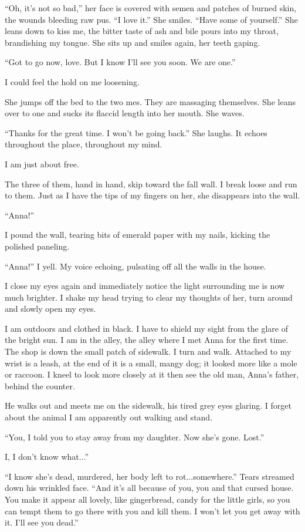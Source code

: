 \documentclass[
]{article}
\begin{document}
``Oh, it's not so bad,'' her face is covered with semen and patches of
burned skin, the wounds bleeding raw pus. ``I love it.'' She smiles.
``Have some of yourself.'' She leans down to kiss me, the bitter taste
of ash and bile pours into my throat, brandishing my tongue. She sits up
and smiles again, her teeth gaping.

``Got to go now, love. But I know I'll see you soon. We are one.''

I could feel the hold on me loosening.

She jumps off the bed to the two mes. They are massaging themselves. She
leans over to one and sucks its flaccid length into her mouth. She
waves.

``Thanks for the great time. I won't be going back.'' She laughs. It
echoes throughout the place, throughout my mind.

I am just about free.

The three of them, hand in hand, skip toward the fall wall. I break
loose and run to them. Just as I have the tips of my fingers on her, she
disappears into the wall.

``Anna!''

I pound the wall, tearing bits of emerald paper with my nails, kicking
the polished paneling.

``Anna!'' I yell. My voice echoing, pulsating off all the walls in the
house.

I close my eyes again and immediately notice the light surrounding me is
now much brighter. I shake my head trying to clear my thoughts of her,
turn around and slowly open my eyes.

I am outdoors and clothed in black. I have to shield my sight from the
glare of the bright sun. I am in the alley, the alley where I met Anna
for the first time. The shop is down the small patch of sidewalk. I turn
and walk. Attached to my wrist is a leash, at the end of it is a small,
mangy dog; it looked more like a mole or raccoon. I kneel to look more
closely at it then see the old man, Anna's father, behind the counter.

He walks out and meets me on the sidewalk, his tired grey eyes glaring.
I forget about the animal I am apparently out walking and stand.

``You, I told you to stay away from my daughter. Now she's gone. Lost.''

I, I don't know what...''

``I know she's dead, murdered, her body left to rot...somewhere.'' Tears
streamed down his wrinkled face. ``And it's all because of you, you and
that cursed house. You make it appear all lovely, like gingerbread,
candy for the little girls, so you can tempt them to go there with you
and kill them. I won't let you get away with it. I'll see you dead.''
\end{document}
